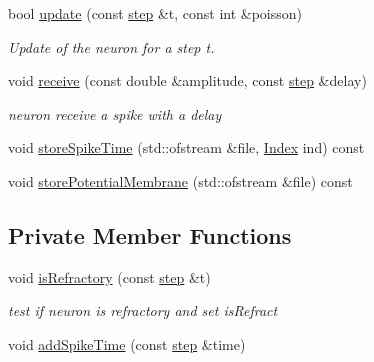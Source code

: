 \begin{DoxyCompactItemize}
bool \hyperlink{classNeuron_aaa96ff4506306c055bd12d7f09610485}{update} (const \hyperlink{constant_8hpp_a58a8d380569868e765017aef9c749646}{step} \&t, const int \&poisson)
\begin{DoxyCompactList}\small\item\em Update of the neuron for a step t. \end{DoxyCompactList}\item 
void \hyperlink{classNeuron_a585b933c1a32ca293400f3ad52b2fac7}{receive} (const double \&amplitude, const \hyperlink{constant_8hpp_a58a8d380569868e765017aef9c749646}{step} \&delay)
\begin{DoxyCompactList}\small\item\em neuron receive a spike with a delay \end{DoxyCompactList}\item 
void \hyperlink{classNeuron_add160271dc673fca4fd3b6571d571111}{store\-Spike\-Time} (std\-::ofstream \&file, \hyperlink{constant_8hpp_a5d7deb06d9443e7d4a47bf078638cc91}{Index} ind) const 
\item 
void \hyperlink{classNeuron_ad8d822198b5b577d208ddb1cb2488e27}{store\-Potential\-Membrane} (std\-::ofstream \&file) const 
\end{DoxyCompactItemize}
\subsection*{Private Member Functions}
\begin{DoxyCompactItemize}
\item 
void \hyperlink{classNeuron_ad9f00a4cd0ce1a673d1c733e0ea1f698}{is\-Refractory} (const \hyperlink{constant_8hpp_a58a8d380569868e765017aef9c749646}{step} \&t)
\begin{DoxyCompactList}\small\item\em test if neuron is refractory and set is\-Refract \end{DoxyCompactList}\item 
void \hyperlink{classNeuron_a20fb030731413a154fdd5bb9885c11de}{add\-Spike\-Time} (const \hyperlink{constant_8hpp_a58a8d380569868e765017aef9c749646}{step} \&time)
\end{DoxyCompactItemize}
